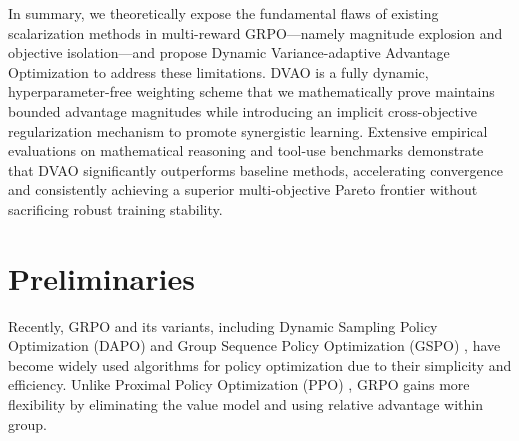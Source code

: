 \documentclass{llmxive}
\begin{document}

In summary, we theoretically expose the fundamental flaws of existing scalarization methods in multi-reward GRPO—namely magnitude explosion and objective isolation—and propose Dynamic Variance-adaptive Advantage Optimization to address these limitations. DVAO is a fully dynamic, hyperparameter-free weighting scheme that we mathematically prove maintains bounded advantage magnitudes while introducing an implicit cross-objective regularization mechanism to promote synergistic learning. Extensive empirical evaluations on mathematical reasoning and tool-use benchmarks demonstrate that DVAO significantly outperforms baseline methods, accelerating convergence and consistently achieving a superior multi-objective Pareto frontier without sacrificing robust training stability.
\section{Preliminaries}
Recently, GRPO \citep{grpo} and its variants, including Dynamic Sampling Policy Optimization (DAPO) \citep{dapo} and Group Sequence Policy Optimization (GSPO) \citep{gspo}, have become widely used algorithms for policy optimization due to their simplicity and efficiency. Unlike Proximal Policy Optimization (PPO) \citep{ppo}, GRPO gains more flexibility by eliminating the value model and using relative advantage within group.
\end{document}
